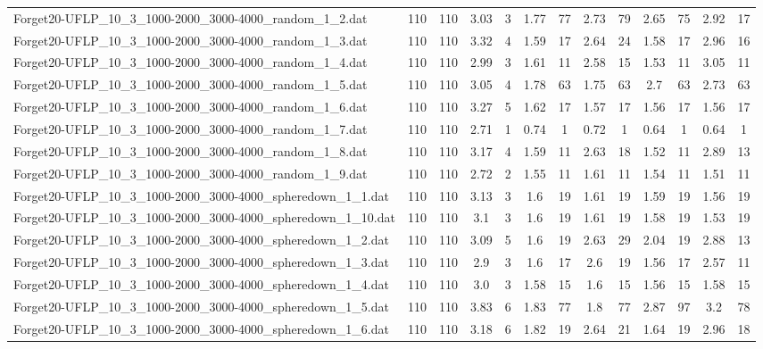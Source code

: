 \begin{table}[!ht]
{\begin{tabular}{lcccccccccccc}
Forget20-UFLP\_10\_3\_1000-2000\_3000-4000\_random\_1\_2.dat & 110 & 110 & 3.03 & 3 & 1.77 & 77 & 2.73 & 79 & 2.65 & 75 & 2.92 & 17 \\
Forget20-UFLP\_10\_3\_1000-2000\_3000-4000\_random\_1\_3.dat & 110 & 110 & 3.32 & 4 & 1.59 & 17 & 2.64 & 24 & 1.58 & 17 & 2.96 & 16 \\
Forget20-UFLP\_10\_3\_1000-2000\_3000-4000\_random\_1\_4.dat & 110 & 110 & 2.99 & 3 & 1.61 & 11 & 2.58 & 15 & 1.53 & 11 & 3.05 & 11 \\
Forget20-UFLP\_10\_3\_1000-2000\_3000-4000\_random\_1\_5.dat & 110 & 110 & 3.05 & 4 & 1.78 & 63 & 1.75 & 63 & 2.7 & 63 & 2.73 & 63 \\
Forget20-UFLP\_10\_3\_1000-2000\_3000-4000\_random\_1\_6.dat & 110 & 110 & 3.27 & 5 & 1.62 & 17 & 1.57 & 17 & 1.56 & 17 & 1.56 & 17 \\
Forget20-UFLP\_10\_3\_1000-2000\_3000-4000\_random\_1\_7.dat & 110 & 110 & 2.71 & 1 & 0.74 & 1 & 0.72 & 1 & 0.64 & 1 & 0.64 & 1 \\
Forget20-UFLP\_10\_3\_1000-2000\_3000-4000\_random\_1\_8.dat & 110 & 110 & 3.17 & 4 & 1.59 & 11 & 2.63 & 18 & 1.52 & 11 & 2.89 & 13 \\
Forget20-UFLP\_10\_3\_1000-2000\_3000-4000\_random\_1\_9.dat & 110 & 110 & 2.72 & 2 & 1.55 & 11 & 1.61 & 11 & 1.54 & 11 & 1.51 & 11 \\
Forget20-UFLP\_10\_3\_1000-2000\_3000-4000\_spheredown\_1\_1.dat & 110 & 110 & 3.13 & 3 & 1.6 & 19 & 1.61 & 19 & 1.59 & 19 & 1.56 & 19 \\
Forget20-UFLP\_10\_3\_1000-2000\_3000-4000\_spheredown\_1\_10.dat & 110 & 110 & 3.1 & 3 & 1.6 & 19 & 1.61 & 19 & 1.58 & 19 & 1.53 & 19 \\
Forget20-UFLP\_10\_3\_1000-2000\_3000-4000\_spheredown\_1\_2.dat & 110 & 110 & 3.09 & 5 & 1.6 & 19 & 2.63 & 29 & 2.04 & 19 & 2.88 & 13 \\
Forget20-UFLP\_10\_3\_1000-2000\_3000-4000\_spheredown\_1\_3.dat & 110 & 110 & 2.9 & 3 & 1.6 & 17 & 2.6 & 19 & 1.56 & 17 & 2.57 & 11 \\
Forget20-UFLP\_10\_3\_1000-2000\_3000-4000\_spheredown\_1\_4.dat & 110 & 110 & 3.0 & 3 & 1.58 & 15 & 1.6 & 15 & 1.56 & 15 & 1.58 & 15 \\
Forget20-UFLP\_10\_3\_1000-2000\_3000-4000\_spheredown\_1\_5.dat & 110 & 110 & 3.83 & 6 & 1.83 & 77 & 1.8 & 77 & 2.87 & 97 & 3.2 & 78 \\
Forget20-UFLP\_10\_3\_1000-2000\_3000-4000\_spheredown\_1\_6.dat & 110 & 110 & 3.18 & 6 & 1.82 & 19 & 2.64 & 21 & 1.64 & 19 & 2.96 & 18 \\

\end{tabular}}
\end{table}
